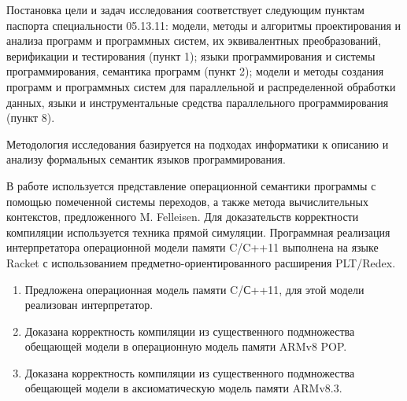 Постановка цели и задач исследования соответствует следующим пунктам паспорта специальности 05.13.11:
модели, методы и алгоритмы проектирования и анализа программ и программных систем, их эквивалентных преобразований, верификации и тестирования (пункт 1);
языки программирования и системы программирования, семантика программ (пункт 2);
модели и методы создания программ и программных систем для параллельной и распределенной обработки данных,
языки и инструментальные средства параллельного программирования (пункт 8).

{\methods}
Методология исследования базируется на подходах информатики
к описанию и анализу формальных семантик языков программирования.

В работе используется представление операционной семантики программы с помощью помеченной системы переходов,
а также метода вычислительных контекстов, предложенного M. Felleisen.
Для доказательств корректности компиляции используется техника прямой симуляции.
Программная реализация интерпретатора операционной модели памяти C/C++11 выполнена на языке Racket
с использованием предметно-ориентированного расширения PLT/Redex.

{{}
\begin{enumerate}
  \item Предложена операционная модель памяти C/С++11, для этой модели реализован интерпретатор.
  \item Доказана корректность компиляции из существенного подмножества обещающей модели в операционную модель памяти ARMv8 POP.
  \item Доказана корректность компиляции из существенного подмножества обещающей модели в аксиоматическую модель памяти ARMv8.3.
\end{enumerate}
}


